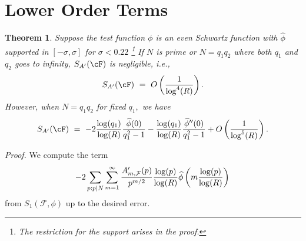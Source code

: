 \documentclass[11pt, reqno]{amsart}
\newtheorem{theorem}{Theorem}[section]
\theoremstyle{definition}
\theoremstyle{remark}
\numberwithin{equation}{section}
\renewcommand{\hat}{\widehat}
\begin{document}
\vspace{1em}
\section{Lower Order Terms} \label{chp: lower order terms}
\begin{theorem}\label{thm:SA'}
Suppose the test function $\phi$ is an even Schwartz function with $\hat\phi$ supported in $[-\sigma,\sigma]$ for $\sigma<0.22$ \footnote{The restriction for the support arises in the proof.} If $N$ is prime or $N=q_1q_2$ where both $q_1 $ and $q_2$ goes to infinity, $S_{A'}(\cF)$ is negligible, i.e., $$S_{A'}(\cF)\ = \ O\left(\frac{1}{\log^4(R)}\right).$$
    However, when $N = q_1q_2$ for fixed $q_1,$ we have
    \begin{align}
        S_{A'}(\cF) \ =\ -2\frac{\log(q_1)}{\log(R)}\frac{\hat\phi(0)}{q_1^2-1} - \frac{\log(q_1)}{\log(R)}\frac{\hat\phi''(0)}{q_1^2-1} + O\left(\frac{1}{\log^5(R)}\right).
    \end{align}
\end{theorem}
\noindent \textit{Proof.} We compute the term 
\[
-2\sum_{p: p|N}\sum_{m=1}^{\infty}\frac{A'_{m, \mathcal{F}}(p)}{p^{m/2}}\frac{\log(p)}{\log(R)}\hat{\phi}\left(m \frac{\log(p)}{\log(R)} \right)\notag \\
\]
from $S_1(\mathcal{F}, \phi)$ up to the desired error.

\vspace{1em}
\end{document}
